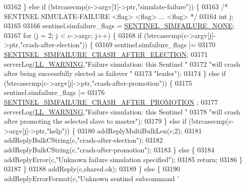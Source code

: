 \begin{DoxyCode}
{{{{{{{{{{{{{{{{{{{{{{{{{{{{{{{{{{{{{{{{{{{{{{{{{{{{{{{{{{{{{{03162     \} \textcolor{keywordflow}{else} \textcolor{keywordflow}{if} (!strcasecmp(c->argv[1]->ptr,\textcolor{stringliteral}{"simulate-failure"})) \{
03163         \textcolor{comment}{/* SENTINEL SIMULATE-FAILURE <flag> <flag> ... <flag> */}
03164         \textcolor{keywordtype}{int} j;
03165 
03166         sentinel.simfailure\_flags = \hyperlink{sentinel_8c_a045e4b70a9044e6e62c9cf6aafff8d3f}{SENTINEL\_SIMFAILURE\_NONE};
03167         \textcolor{keywordflow}{for} (j = 2; j < c->argc; j++) \{
03168             \textcolor{keywordflow}{if} (!strcasecmp(c->argv[j]->ptr,\textcolor{stringliteral}{"crash-after-election"})) \{
03169                 sentinel.simfailure\_flags |=
03170                     \hyperlink{sentinel_8c_a8549938b8489bb23679cf13b8d99997c}{SENTINEL\_SIMFAILURE\_CRASH\_AFTER\_ELECTION};
03171                 serverLog(\hyperlink{server_8h_a31229b9334bba7d6be2a72970967a14b}{LL\_WARNING},\textcolor{stringliteral}{"Failure simulation: this Sentinel "}
03172                     \textcolor{stringliteral}{"will crash after being successfully elected as failover "}
03173                     \textcolor{stringliteral}{"leader"});
03174             \} \textcolor{keywordflow}{else} \textcolor{keywordflow}{if} (!strcasecmp(c->argv[j]->ptr,\textcolor{stringliteral}{"crash-after-promotion"})) \{
03175                 sentinel.simfailure\_flags |=
03176                     \hyperlink{sentinel_8c_a87a09f4dcf854cc0b26dc8dc328ab7c3}{SENTINEL\_SIMFAILURE\_CRASH\_AFTER\_PROMOTION}
      ;
03177                 serverLog(\hyperlink{server_8h_a31229b9334bba7d6be2a72970967a14b}{LL\_WARNING},\textcolor{stringliteral}{"Failure simulation: this Sentinel "}
03178                     \textcolor{stringliteral}{"will crash after promoting the selected slave to master"});
03179             \} \textcolor{keywordflow}{else} \textcolor{keywordflow}{if} (!strcasecmp(c->argv[j]->ptr,\textcolor{stringliteral}{"help"})) \{
03180                 addReplyMultiBulkLen(c,2);
03181                 addReplyBulkCString(c,\textcolor{stringliteral}{"crash-after-election"});
03182                 addReplyBulkCString(c,\textcolor{stringliteral}{"crash-after-promotion"});
03183             \} \textcolor{keywordflow}{else} \{
03184                 addReplyError(c,\textcolor{stringliteral}{"Unknown failure simulation specified"});
03185                 \textcolor{keywordflow}{return};
03186             \}
03187         \}
03188         addReply(c,shared.ok);
03189     \} \textcolor{keywordflow}{else} \{
03190         addReplyErrorFormat(c,\textcolor{stringliteral}{"Unknown sentinel subcommand '%
}}}}}}}}}}}}}}}}}}}}}}}}}}}}}}}}}}}}}}}}}}}}}}}}}}}}}}}}}}}}}}}
\end{DoxyCode}
